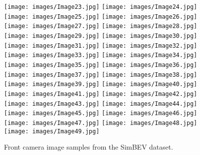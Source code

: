 \begin{figure*}[t]
    \texttt{[image: images/Image23.jpg]}\hspace{-2.5pt}
    \texttt{[image: images/Image24.jpg]}\hspace{-2.5pt}
    \texttt{[image: images/Image25.jpg]}\hspace{-2.5pt}
    \texttt{[image: images/Image26.jpg]}\hspace{-2.5pt}
    \texttt{[image: images/Image27.jpg]}\hspace{-2.5pt}
    \texttt{[image: images/Image28.jpg]}
    \texttt{[image: images/Image29.jpg]}\hspace{-2.5pt}
    \texttt{[image: images/Image30.jpg]}\hspace{-2.5pt}
    \texttt{[image: images/Image31.jpg]}\hspace{-2.5pt}
    \texttt{[image: images/Image32.jpg]}\hspace{-2.5pt}
    \texttt{[image: images/Image33.jpg]}\hspace{-2.5pt}
    \texttt{[image: images/Image34.jpg]}\hspace{-2.5pt}
    \texttt{[image: images/Image35.jpg]}
    \texttt{[image: images/Image36.jpg]}\hspace{-2.5pt}
    \texttt{[image: images/Image37.jpg]}\hspace{-2.5pt}
    \texttt{[image: images/Image38.jpg]}\hspace{-2.5pt}
    \texttt{[image: images/Image39.jpg]}\hspace{-2.5pt}
    \texttt{[image: images/Image40.jpg]}\hspace{-2.5pt}
    \texttt{[image: images/Image41.jpg]}\hspace{-2.5pt}
    \texttt{[image: images/Image42.jpg]}
    \texttt{[image: images/Image43.jpg]}\hspace{-2.5pt}
    \texttt{[image: images/Image44.jpg]}\hspace{-2.5pt}
    \texttt{[image: images/Image45.jpg]}\hspace{-2.5pt}
    \texttt{[image: images/Image46.jpg]}\hspace{-2.5pt}
    \texttt{[image: images/Image47.jpg]}\hspace{-2.5pt}
    \texttt{[image: images/Image48.jpg]}\hspace{-2.5pt}
    \texttt{[image: images/Image49.jpg]}
    \setlength{\abovecaptionskip}{-10 pt}
    \setlength{\belowcaptionskip}{-14 pt}
    \caption{Front camera image samples from the SimBEV dataset.}\label{fig:image-samples}
\end{figure*}

